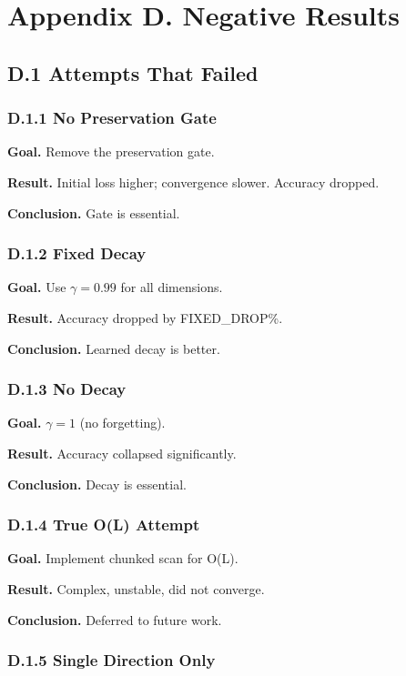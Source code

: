 \section{Appendix D. Negative Results}

\subsection{D.1 Attempts That Failed}

\subsubsection{D.1.1 No Preservation Gate}

\textbf{Goal.} Remove the preservation gate.

\textbf{Result.} Initial loss higher; convergence slower. Accuracy dropped.

\textbf{Conclusion.} Gate is essential.

\subsubsection{D.1.2 Fixed Decay}

\textbf{Goal.} Use $\gamma = 0.99$ for all dimensions.

\textbf{Result.} Accuracy dropped by {{FIXED\_DROP}}\%.

\textbf{Conclusion.} Learned decay is better.

\subsubsection{D.1.3 No Decay}

\textbf{Goal.} $\gamma = 1$ (no forgetting).

\textbf{Result.} Accuracy collapsed significantly.

\textbf{Conclusion.} Decay is essential.

\subsubsection{D.1.4 True O(L) Attempt}

\textbf{Goal.} Implement chunked scan for O(L).

\textbf{Result.} Complex, unstable, did not converge.

\textbf{Conclusion.} Deferred to future work.

\subsubsection{D.1.5 Single Direction Only}

